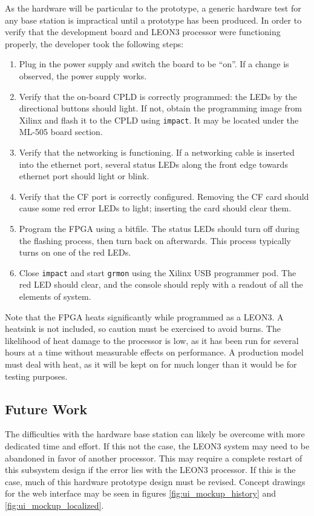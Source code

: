 As the hardware will be particular to the prototype, a generic
hardware test for any base station is impractical until a prototype has
been produced. In order to verify that the development board and LEON3
processor were functioning properly, the developer took the following steps:
\begin{enumerate}
  \item Plug in the power supply and switch the board to be ``on''. If a
    change is observed, the power supply works.
  \item Verify that the on-board \ac{CPLD} is correctly programmed: the
    \acp{LED} by the directional buttons should light. If not, obtain the
    programming image from Xilinx and flash it to the \ac{CPLD} using
    \texttt{impact}. It may be located under the ML-505 board section.
  \item Verify that the networking is functioning. If a networking cable is
    inserted into the ethernet port, several status \acp{LED} along the
    front edge towards ethernet port should light or blink.
  \item Verify that the \ac{CF} port is correctly configured. Removing the
    \ac{CF} card should cause some red error \acp{LED} to light; inserting
    the card should clear them.
  \item Program the \ac{FPGA} using a bitfile. The status \acp{LED} should
    turn off during the flashing process, then turn back on
    afterwards. This process typically turns on one of the red \acp{LED}.
  \item Close \texttt{impact} and start \texttt{grmon} using the Xilinx
    \ac{USB} programmer pod. The red \ac{LED} should clear, and the console
    should reply with a readout of all the elements of system.
\end{enumerate}
Note that the \ac{FPGA} heats significantly while programmed as a LEON3. A
heatsink is not included, so caution must be exercised to avoid burns. The
likelihood of heat damage to the processor is low, as it has been run for
several hours at a time without measurable effects on performance. A
production model must deal with heat, as it will be kept on for much longer
than it would be for testing purposes.

\subsection{Future Work}
The difficulties with the hardware base station can likely be overcome with
more dedicated time and effort. If this not the case, the LEON3 system may
need to be abandoned in favor of another processor. This may require a
complete restart of this subsystem design if the error lies with the LEON3
processor. If this is the case, much of this hardware prototype design must
be revised. Concept drawings for the web interface may be seen in figures
\ref{fig:ui_mockup_history} and \ref{fig:ui_mockup_localized}.

